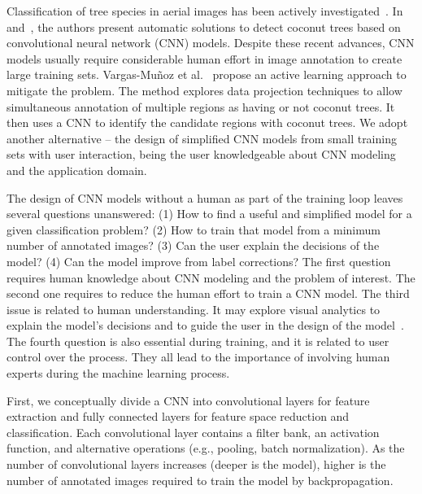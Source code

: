 Classification of tree species in aerial images has been actively investigated~\cite{fassnacht2016review}. In \cite{puttemans2018comparing} and~\cite{aparna2018cnn}, the authors present automatic solutions to detect coconut trees based on convolutional neural network (CNN) models. Despite these recent advances, CNN models usually require considerable human effort in image annotation to create large training sets. Vargas-Muñoz et al.~\cite{8899005} propose an active learning approach to mitigate the problem. The method explores data projection techniques to allow simultaneous annotation of multiple regions as having or not coconut trees. It then uses a CNN to identify the candidate regions with coconut trees. We adopt another alternative -- the design of simplified CNN models from small training sets with user interaction, being the user knowledgeable about CNN modeling and the application domain.

The design of CNN models without a human as part of the training loop leaves several questions unanswered: (1) How to find a useful and simplified model for a given classification problem? (2) How to train that model from a minimum number of annotated images?  (3) Can the user explain the decisions of the model? (4) Can the model improve from label corrections? The first question requires human knowledge about CNN modeling and the problem of interest. The second one requires to reduce the human effort to train a CNN model. The third issue is related to human understanding. It may explore visual analytics to explain the model's decisions and to guide the user in the design of the model~\cite{RauberInfoVis2018,GarciaIJCNN2019,SpinnerTVCG2020}. The fourth question is also essential during training, and it is related to user control over the process. They all lead to the importance of involving human experts during the machine learning process. 

First, we conceptually divide a CNN into convolutional layers for feature extraction and fully connected layers for feature space reduction and classification. Each convolutional layer contains a filter bank, an activation function, and alternative operations (e.g., pooling, batch normalization).  As the number of convolutional layers increases (deeper is the model), higher is the number of annotated images required to train the model by backpropagation. 

